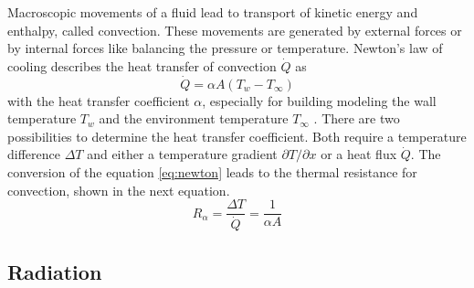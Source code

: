     Macroscopic movements of a fluid  lead to transport of kinetic energy and enthalpy, called convection. These movements are generated by external forces or by internal forces like balancing the pressure or temperature.\cite{.2013}
    \newline
    Newton's law of cooling describes the heat transfer of convection $\dot{Q}$ as 
    \begin{equation}
    \label{eq:newton}
        \dot{Q} = \alpha A (T_w - T_\infty)
    \end{equation}
    with the heat transfer coefficient $\alpha$, especially for building modeling the wall temperature $T_w$ and the environment temperature $T_\infty$ \cite{Griesinger.2019}
    . There are two possibilities to determine the heat transfer coefficient. Both require a temperature difference $\Delta T$ and either a temperature gradient $\partial T/\partial x$ or a heat flux $\dot{Q}$.
    \cite{.2013} 
    \newline
    The conversion of the equation \ref{eq:newton} leads to the thermal resistance for convection, shown in the next equation.\cite{Griesinger.2019}
    \begin{equation}
        R_\alpha = \frac{\Delta T}{\dot{Q}} = \frac{1}{\alpha A}
    \end{equation}

\subsection{Radiation}
\label{subsection:radiation}

